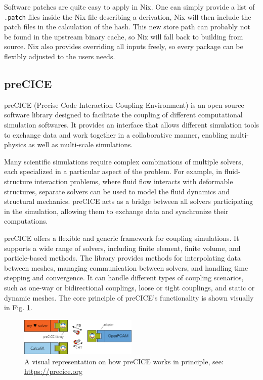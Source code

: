 \documentclass[conference,final,a4paper]{IEEEtran}
\begin{document}
Software patches are quite easy to apply in Nix.
One can simply provide a list of \texttt{.patch} files inside the Nix file describing a derivation, Nix will then include the patch files in the calculation of the hash.
This new store path can probably not be found in the upstream binary cache, so Nix will fall back to building from source.
Nix also provides overriding all inputs freely, so every package can be flexibly adjusted to the users needs.


\subsection{preCICE}

preCICE (Precise Code Interaction Coupling Environment) is an open-source software library designed to facilitate the coupling of different computational simulation softwares.
It provides an interface that allows different simulation tools to exchange data and work together in a collaborative manner, enabling multi-physics as well as multi-scale simulations.

Many scientific simulations require complex combinations of multiple solvers, each specialized in a particular aspect of the problem.
For example, in fluid-structure interaction problems, where fluid flow interacts with deformable structures, separate solvers can be used to model the fluid dynamics and structural mechanics.
preCICE acts as a bridge between all solvers participating in the simulation, allowing them to exchange data and synchronize their computations.

preCICE offers a flexible and generic framework for coupling simulations.
It supports a wide range of solvers, including finite element, finite volume, and particle-based methods.
The library provides methods for interpolating data between meshes, managing communication between solvers, and handling time stepping and convergence.
It can handle different types of coupling scenarios, such as one-way or bidirectional couplings, loose or tight couplings, and static or dynamic meshes.
The core principle of preCICE's functionality is shown visually in Fig. \ref{fig:precice}.

\begin{figure}
    \centering
    \includegraphics[width=0.5\textwidth]{precice-figure.png}
    \caption{A visual representation on how preCICE works in principle, see: \url{https://precice.org}}
    \label{fig:precice}
\end{figure}
\end{document}
